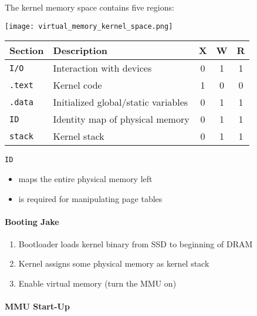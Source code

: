 The kernel memory space contains five regions:

\begin{center}
    \texttt{[image: virtual\_memory\_kernel\_space.png]}
\end{center}

\renewcommand{\arraystretch}{1.3}
\setlength{\oldtabcolsep}{\tabcolsep}\setlength\tabcolsep{6pt}

\begin{tabularx}{\linewidth}{@{}lXccc@{}}
    Section        & Description                         & X & W & R \\
    \midrule
    \texttt{I/O}   & Interaction with devices            & 0 & 1 & 1 \\
    \texttt{.text} & Kernel code                         & 1 & 0 & 0 \\
    \texttt{.data} & Initialized global/static variables & 0 & 1 & 1 \\
    \texttt{ID}    & Identity map of physical memory     & 0 & 1 & 1 \\
    \texttt{stack} & Kernel stack                        & 0 & 1 & 1
\end{tabularx}

\newpar{}

\texttt{ID}
\begin{itemize}
    \item maps the entire physical memory left
    \item is required for manipulating page tables
\end{itemize}

\renewcommand{\arraystretch}{1}
\setlength\tabcolsep{\oldtabcolsep}

\paragraph{Booting Jake}
\begin{enumerate}
    \item Bootloader loads kernel binary from SSD to beginning of DRAM
    \item Kernel assigns some physical memory as kernel stack
    \item Enable virtual memory (turn the MMU on)
\end{enumerate}

\paragraph{MMU Start-Up}

